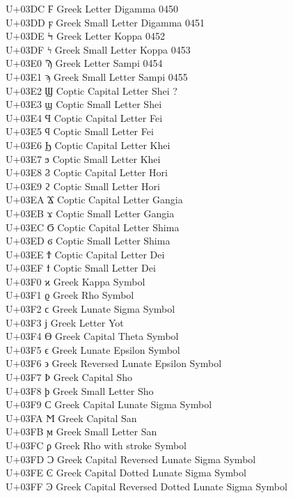 \documentclass[UTF8,nofonts]{ctexart}
\begin{document}
U+03DC  Ϝ Greek Letter Digamma  0450\\
U+03DD  ϝ Greek Small Letter Digamma  0451\\
U+03DE  Ϟ Greek Letter Koppa  0452\\
U+03DF  ϟ Greek Small Letter Koppa  0453\\
U+03E0  Ϡ Greek Letter Sampi  0454\\
U+03E1  ϡ Greek Small Letter Sampi  0455\\
U+03E2  Ϣ Coptic Capital Letter Shei  ?\\
U+03E3  ϣ Coptic Small Letter Shei\\
U+03E4  Ϥ Coptic Capital Letter Fei\\
U+03E5  ϥ Coptic Small Letter Fei\\
U+03E6  Ϧ Coptic Capital Letter Khei\\
U+03E7  ϧ Coptic Small Letter Khei\\
U+03E8  Ϩ Coptic Capital Letter Hori\\
U+03E9  ϩ Coptic Small Letter Hori\\
U+03EA  Ϫ Coptic Capital Letter Gangia\\
U+03EB  ϫ Coptic Small Letter Gangia\\
U+03EC  Ϭ Coptic Capital Letter Shima\\
U+03ED  ϭ Coptic Small Letter Shima\\
U+03EE  Ϯ Coptic Capital Letter Dei\\
U+03EF  ϯ Coptic Small Letter Dei\\
U+03F0  ϰ Greek Kappa Symbol\\
U+03F1  ϱ Greek Rho Symbol\\
U+03F2  ϲ Greek Lunate Sigma Symbol\\
U+03F3  ϳ Greek Letter Yot\\
U+03F4  ϴ Greek Capital Theta Symbol\\
U+03F5  ϵ Greek Lunate Epsilon Symbol\\
U+03F6  ϶ Greek Reversed Lunate Epsilon Symbol\\
U+03F7  Ϸ Greek Capital Sho\\
U+03F8  ϸ Greek Small Letter Sho\\
U+03F9  Ϲ Greek Capital Lunate Sigma Symbol\\
U+03FA  Ϻ Greek Capital San\\
U+03FB  ϻ Greek Small Letter San\\
U+03FC  ϼ Greek Rho with stroke Symbol\\
U+03FD  Ͻ Greek Capital Reversed Lunate Sigma Symbol\\
U+03FE  Ͼ Greek Capital Dotted Lunate Sigma Symbol\\
U+03FF  Ͽ Greek Capital Reversed Dotted Lunate Sigma Symbol\\
\end{document}
